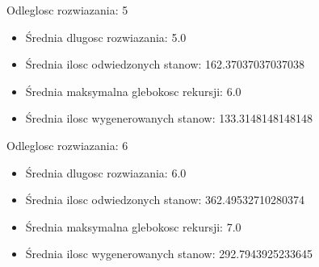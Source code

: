 \documentclass{classrep}
\begin{document}
				Odleglosc rozwiazania: 5
				\begin{itemize}
					\item Średnia dlugosc rozwiazania: 5.0
					\item Średnia ilosc odwiedzonych stanow: 162.37037037037038
					\item Średnia maksymalna glebokosc rekursji: 6.0
					\item Średnia ilosc wygenerowanych stanow: 133.3148148148148
				\end{itemize}
				Odleglosc rozwiazania: 6
				\begin{itemize}
					\item Średnia dlugosc rozwiazania: 6.0
					\item Średnia ilosc odwiedzonych stanow: 362.49532710280374
					\item Średnia maksymalna glebokosc rekursji: 7.0
					\item Średnia ilosc wygenerowanych stanow: 292.7943925233645
				\end{itemize}
				
\end{document}
